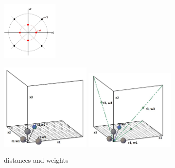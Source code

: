 \documentclass{beamer}
\begin{document}
\begin{frame}
\begin{figure}[h]
	\centering
	\includegraphics[width=0.25\textwidth]{2dconjaxis.jpg}
\end{figure}
\begin{figure}[h]
	\centering
		\includegraphics[width=0.4\textwidth]{3dnthconjaxis.jpg}
			\includegraphics[width=0.4\textwidth]{3dnthconjand2ndconj.jpg}
	\caption{distances and weights}
\end{figure}
\end{frame}
\end{document}
